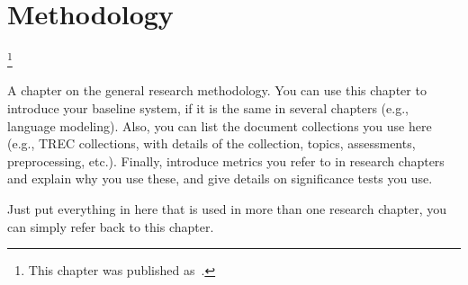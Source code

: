 
\chapter{Methodology}
\label{chapter:methodology}

\footnote[]{This chapter was published as~.}
\acresetall

A chapter on the general research methodology. You can use this chapter to introduce your baseline system, if it is the same in several chapters (e.g., language modeling). Also, you can list the document collections you use here (e.g., TREC collections, with details of the collection, topics, assessments, preprocessing, etc.). Finally, introduce metrics you refer to in research chapters and explain why you use these, and give details on significance tests you use.

Just put everything in here that is used in more than one research chapter, you can simply refer back to this chapter.